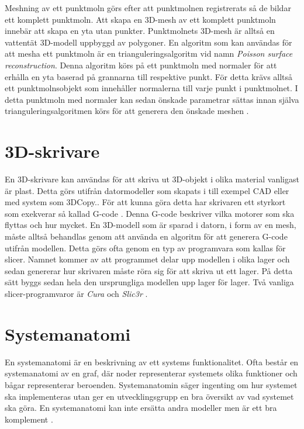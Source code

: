 Meshning av ett punktmoln görs efter att punktmolnen registrerats så de bildar ett komplett punktmoln. Att skapa en 3D-mesh av ett komplett punktmoln innebär att skapa en yta utan punkter. Punktmolnets 3D-mesh är alltså en vattentät 3D-modell uppbyggd av polygoner. En algoritm som kan användas för att mesha ett punktmoln är en trianguleringsalgoritm vid namn \textit{Poisson surface reconstruction}. Denna algoritm körs på ett punktmoln med normaler för att erhålla en yta baserad på grannarna till respektive punkt. För detta krävs alltså ett punktmolnsobjekt som innehåller normalerna till varje punkt i punktmolnet. I detta punktmoln med normaler kan sedan önskade parametrar sättas innan själva trianguleringsalgoritmen körs för att generera den önskade meshen \cite{pcl_surface_reconstruction}\cite{pcl_triangulation_algorithm}. 


\section{3D-skrivare}
En 3D-skrivare kan användas för att skriva ut 3D-objekt i olika material vanligast är plast. Detta görs utifrån datormodeller som skapats i till exempel CAD eller med system som 3DCopy.. För att kunna göra detta har skrivaren ett styrkort som exekverar så kallad G-code \cite{gcode}. Denna G-code beskriver vilka motorer som ska flyttas och hur mycket. En 3D-modell som är sparad i datorn, i form av en mesh, måste alltså behandlas genom att använda en algoritm för att generera G-code utifrån modellen. Detta görs ofta genom en typ av programvara som kallas för slicer. Namnet kommer av att programmet delar upp modellen i olika lager och sedan genererar hur skrivaren måste röra sig för att skriva ut ett lager. På detta sätt byggs sedan hela den ursprungliga modellen upp lager för lager. Två vanliga slicer-programvaror är \textit{Cura} \cite{cura} och \textit{Slic3r} \cite{slic3r}.

\section{Systemanatomi}
En systemanatomi är en beskrivning av ett systems funktionalitet. Ofta består en systemanatomi av en graf, där noder representerar systemets olika funktioner och bågar representerar beroenden. Systemanatomin säger ingenting om hur systemet ska implementeras utan ger en utvecklingsgrupp en bra översikt av vad systemet ska göra. En systemanatomi kan inte ersätta andra modeller men är ett bra komplement \cite{system_anatomy}.


